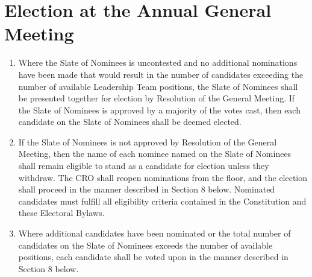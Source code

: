 \section{Election at the Annual General Meeting}
\label{election-at-the-annual-general-meeting}

\begin{enumerate}
 \item Where the Slate of Nominees is uncontested and no additional nominations have been made that would result in the number of candidates exceeding the number of available Leadership Team positions, the Slate of Nominees shall be presented together for election by Resolution of the General Meeting. If the Slate of Nominees is approved by a majority of the votes cast, then each candidate on the Slate of Nominees shall be deemed elected.
 \item If the Slate of Nominees is not approved by Resolution of the General Meeting, then the name of each nominee named on the Slate of Nominees shall remain eligible to stand as a candidate for election unless they withdraw. The CRO shall reopen nominations from the floor, and the election shall proceed in the manner described in Section 8 below. Nominated candidates must fulfill all eligibility criteria contained in the Constitution and these Electoral Bylaws.
 \item Where additional candidates have been nominated or the total number of candidates on the Slate of Nominees exceeds the number of available positions, each candidate shall be voted upon in the manner described in Section 8 below.
\end{enumerate}
